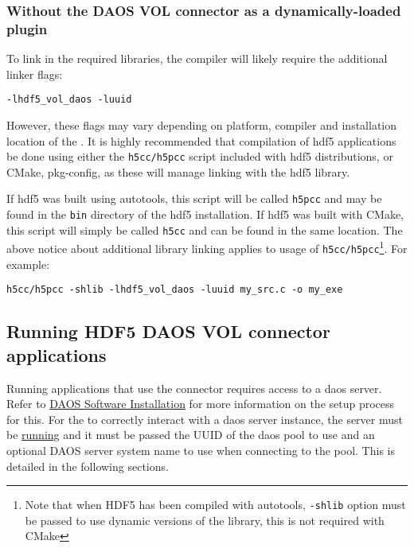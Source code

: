 \documentclass[../users_guide.tex]{subfiles}
\begin{document}
\subsubsection{Without the DAOS VOL connector as a dynamically-loaded plugin}

To link in the required libraries, the compiler will likely require the
additional linker flags:

\begin{verbatim}
-lhdf5_vol_daos -luuid
\end{verbatim}

However, these flags may vary depending on platform, compiler and installation
location of the \dvc{}. It is highly recommended that compilation
of \acrshort{hdf5} \dvc{} applications be done using either the
\texttt{h5cc/h5pcc} script included with \acrshort{hdf5} distributions, or CMake,
pkg-config, as these will manage linking with the \acrshort{hdf5} library.

If \acrshort{hdf5} was built using autotools, this script will be called \texttt{h5pcc} and
may be found in the \texttt{bin} directory of the \acrshort{hdf5} installation. If \acrshort{hdf5}
was built with CMake, this script will simply be called \texttt{h5cc} and can
be found in the same location. The above notice about additional library
linking applies to usage of \texttt{h5cc/h5pcc}\footnote{Note that when HDF5 has been
compiled with autotools, \texttt{-shlib} option must be passed to use dynamic versions
of the library, this is not required with CMake}. For example:
\begin{verbatim}
h5cc/h5pcc -shlib -lhdf5_vol_daos -luuid my_src.c -o my_exe
\end{verbatim}

\subsection{Running HDF5 DAOS VOL connector applications}
\label{running_daos_vol_apps}

Running applications that use the \dvc{} connector requires access to a \acrshort{daos}
server. Refer to
\href{https://daos-stack.github.io/admin/installation/}{DAOS Software Installation}
for more information on the setup process for this. For the \dvc{}
to correctly interact with a \acrshort{daos} server instance, the server must be \hyperref[sec:daos_serv_start]{running} and it must be passed the UUID of the
\acrshort{daos} pool to use and an optional DAOS server system name to use when connecting to the pool. This is detailed in the following sections.
\end{document}
